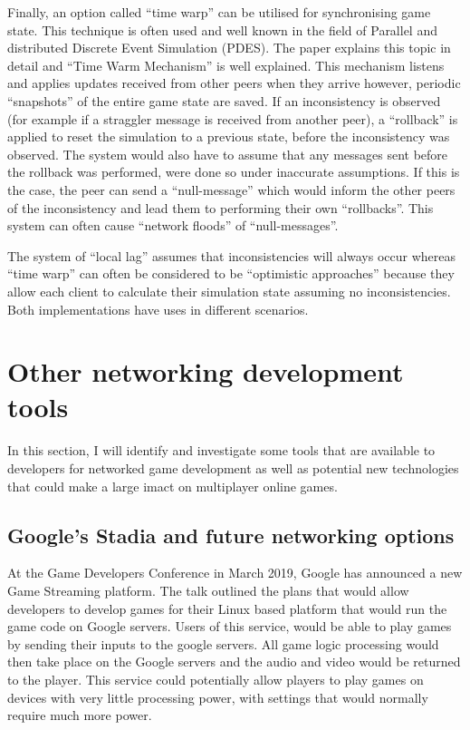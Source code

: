 Finally, an option called ``time warp'' can be utilised for synchronising game state. This technique is often used and well known in the field of Parallel and distributed Discrete Event Simulation (PDES). The paper  explains this topic in detail and ``Time Warm Mechanism'' is well explained. This mechanism listens and applies updates received from other peers when they arrive however, periodic ``snapshots'' of the entire game state are saved. If an inconsistency is observed (for example if a straggler message is received from another peer), a ``rollback'' is applied to reset the simulation to a previous state, before the inconsistency was observed. The system would also have to assume that any messages sent before the rollback was performed, were done so under inaccurate assumptions. If this is the case, the peer can send a ``null-message'' which would inform the other peers of the inconsistency and lead them to performing their own ``rollbacks''. This system can often cause ``network floods'' of ``null-messages''.

The system of ``local lag'' assumes that inconsistencies will always occur whereas ``time warp'' can often be considered to be ``optimistic approaches'' because they allow each client to calculate their simulation state assuming no inconsistencies. Both implementations have uses in different scenarios.

\section{Other networking development tools}
In this section, I will identify and investigate some tools that are available to developers for networked game development as well as potential new technologies that could make a large imact on multiplayer online games.


\subsection{Google's Stadia and future networking options}
At the Game Developers Conference in March 2019, Google has announced a new Game Streaming platform. The talk outlined the plans that would allow developers to develop games for their Linux based platform that would run the game code on Google servers. Users of this service, would be able to play games by sending their inputs to the google servers. All game logic processing would then take place on the Google servers and the audio and video would be returned to the player. This service could potentially allow players to play games on devices with very little processing power, with settings that would normally require much more power.

